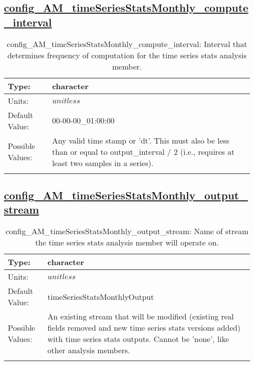 \subsection[config\_AM\_timeSeriesStatsMonthly\_compute\_interval]{\hyperref[sec:nm_tab_AM_timeSeriesStatsMonthly]{config\_AM\_timeSeriesStatsMonthly\_compute\_interval}}
\label{subsec:nm_sec_config_AM_timeSeriesStatsMonthly_compute_interval}
\begin{center}
\begin{longtable}{| p{2.0in} || p{4.0in} |}
    \hline
    Type: & character \\
    \hline
    Units: & $unitless$ \\
    \hline
    Default Value: & 00-00-00\_01:00:00 \\
    \hline
    Possible Values: & Any valid time stamp or 'dt'. This must also be less than or equal to output\_interval / 2 (i.e., requires at least two samples in a series). \\
    \hline
    \caption{config\_AM\_timeSeriesStatsMonthly\_compute\_interval: Interval that determines frequency of computation for the time series stats analysis member.}
\end{longtable}
\end{center}
\subsection[config\_AM\_timeSeriesStatsMonthly\_output\_stream]{\hyperref[sec:nm_tab_AM_timeSeriesStatsMonthly]{config\_AM\_timeSeriesStatsMonthly\_output\_stream}}
\label{subsec:nm_sec_config_AM_timeSeriesStatsMonthly_output_stream}
\begin{center}
\begin{longtable}{| p{2.0in} || p{4.0in} |}
    \hline
    Type: & character \\
    \hline
    Units: & $unitless$ \\
    \hline
    Default Value: & timeSeriesStatsMonthlyOutput \\
    \hline
    Possible Values: & An existing stream that will be modified (existing real fields removed and new time series stats versions added) with time series stats outputs. Cannot be 'none', like other analysis members. \\
    \hline
    \caption{config\_AM\_timeSeriesStatsMonthly\_output\_stream: Name of stream the time series stats analysis member will operate on.}
\end{longtable}
\end{center}
